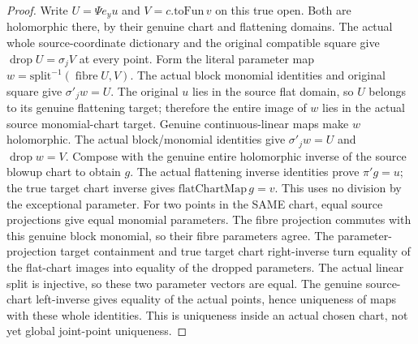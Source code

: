 \begin{proof}
Write $U=\Psi e_y u$ and $V=c.\mathrm{toFun}\,v$ on this true open. Both are
holomorphic there, by their genuine chart and flattening domains. The actual
whole source-coordinate dictionary and the original compatible square give
$\operatorname{drop}U=\sigma_j V$ at every point. Form the literal parameter
map $w=\mathrm{split}^{-1}(\operatorname{fibre}U,V)$. The actual block monomial identities and original square give $\sigma'_j w=U$. The original $u$ lies in the source flat domain, so $U$ belongs to its genuine flattening target; therefore the entire image of $w$ lies in the actual source monomial-chart target. Genuine continuous-linear maps make $w$ holomorphic. The actual
block/monomial identities give $\sigma'_j w=U$ and
$\operatorname{drop}w=V$. Compose with the genuine entire holomorphic inverse
of the source blowup chart to obtain $g$. The actual flattening inverse
identities prove $\pi'g=u$; the true target chart inverse gives
$\mathrm{flatChartMap}\,g=v$. This uses no division by the exceptional
parameter. For two points in the SAME chart, equal source projections give equal monomial parameters. The fibre projection commutes with this genuine block monomial, so their fibre parameters agree. The parameter-projection target containment and true target chart right-inverse turn equality of the flat-chart images into equality of the dropped parameters. The actual linear split is injective, so these two parameter vectors are equal. The genuine source-chart left-inverse gives equality of the actual points, hence uniqueness of maps with these whole identities. This is uniqueness inside an actual chosen chart, not yet global
joint-point uniqueness.
\end{proof}

